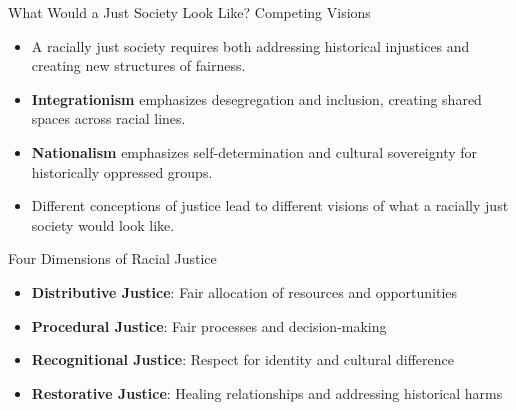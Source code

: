 \documentclass{beamer}
\begin{document}
	\begin{frame}{What Would a Just Society Look Like? Competing Visions}
		\begin{itemize}
			\item A racially just society requires both addressing historical injustices and creating new structures of fairness.
			\item \textbf{Integrationism} emphasizes desegregation and inclusion, creating shared spaces across racial lines.
			\item \textbf{Nationalism} emphasizes self-determination and cultural sovereignty for historically oppressed groups.
			\item Different conceptions of justice lead to different visions of what a racially just society would look like.
		\end{itemize}
		
		\begin{block}{Four Dimensions of Racial Justice}
			\begin{itemize}
				\item \textbf{Distributive Justice}: Fair allocation of resources and opportunities
				\item \textbf{Procedural Justice}: Fair processes and decision-making
				\item \textbf{Recognitional Justice}: Respect for identity and cultural difference
				\item \textbf{Restorative Justice}: Healing relationships and addressing historical harms
			\end{itemize}
		\end{block}
	\end{frame}
	
\end{document}

